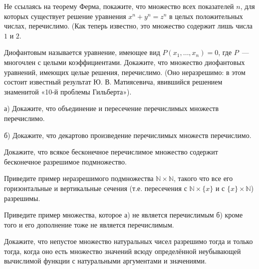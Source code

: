 \setcounter{curtask}{1}


\begin{task}
	Не ссылаясь на теорему Ферма, покажите, что множество всех показателей $n$, для которых существует решение уравнения $x^n +
    y^n = z^n$ в целых положительных числах, перечислимо. (Как теперь известно, это множество содержит лишь числа $1$ и $2$.
\end{task}


\begin{task}
    Диофантовым называется уравнение, имеющее вид $P(x_1, \dots, x_n) = 0$, где $P$~--- многочлен с целыми
    коэффициентами. Докажите, что множество диофантовых уравнений, имеющих целые решения, перечислимо. (Оно неразрешимо: в этом
    состоит известный результат Ю. В. Матиясевича, явившийся решением знаменитой «10-й проблемы Гильберта»).
\end{task}


\begin{task}
	а) Докажите, что объединение и пересечение перечислимых множеств перечислимо.

    б) Докажите, что декартово произведение перечислимых множеств перечислимо. 
\end{task}


\begin{task}
    Докажите, что всякое бесконечное перечислимое множество содержит бесконечное разрешимое подмножество.
\end{task}

\begin{task}
    Приведите пример неразрешимого подмножества $\mathbb{N} \times \mathbb{N}$, такого что все его горизонтальные и вертикальные
    сечения (т.е. пересечения с $\mathbb{N} \times \{x\} $ и с $\{x\} \times \mathbb{N}$) разрешимы.
\end{task}


\begin{task}
    Приведите пример множества, которое а) не является перечислимым б) кроме того и его дополнение тоже не является перечислимым.
\end{task}

\begin{task}
    Докажите, что непустое множество натуральных чисел разрешимо тогда и только тогда, когда оно есть множество значений всюду
    определённой неубывающей вычислимой функции с натуральными аргументами и значениями.
\end{task}